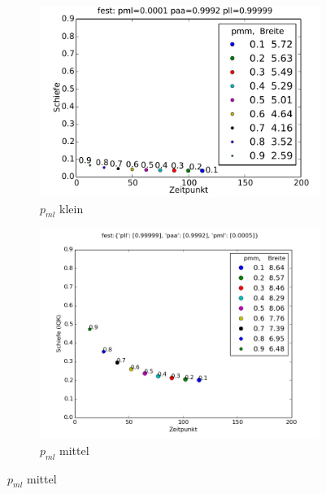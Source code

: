 \begin{figure}
\begin{subfigure}{0.6\textwidth}
\includegraphics[width=\textwidth]{bilder/pmm/3fest_p_00001_09992_099999}
\caption{$p_{ml}$ klein}
\end{subfigure}

\begin{subfigure}{0.6\textwidth}
\includegraphics[width=\textwidth]{bilder/pmm/3fest_p_00005_09992_099999}
\caption{$p_{ml}$ mittel}
\end{subfigure}


\end{figure}
